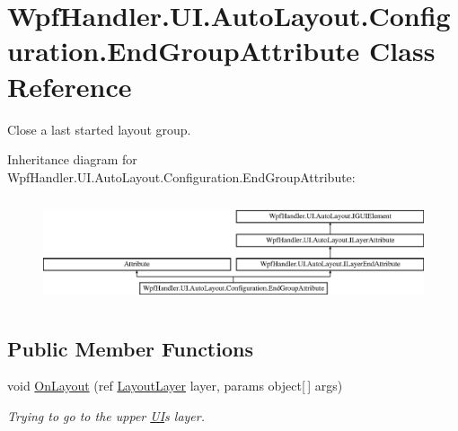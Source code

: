 \hypertarget{class_wpf_handler_1_1_u_i_1_1_auto_layout_1_1_configuration_1_1_end_group_attribute}{}\section{Wpf\+Handler.\+U\+I.\+Auto\+Layout.\+Configuration.\+End\+Group\+Attribute Class Reference}
\label{class_wpf_handler_1_1_u_i_1_1_auto_layout_1_1_configuration_1_1_end_group_attribute}


Close a last started layout group.  


Inheritance diagram for Wpf\+Handler.\+U\+I.\+Auto\+Layout.\+Configuration.\+End\+Group\+Attribute\+:\begin{figure}[H]
\begin{center}
\leavevmode
\includegraphics[height=3.128492cm]{db/de0/class_wpf_handler_1_1_u_i_1_1_auto_layout_1_1_configuration_1_1_end_group_attribute}
\end{center}
\end{figure}
\subsection*{Public Member Functions}
\begin{DoxyCompactItemize}
\item 
void \mbox{\hyperlink{class_wpf_handler_1_1_u_i_1_1_auto_layout_1_1_configuration_1_1_end_group_attribute_acaed685d0daf2b14d8f232389d56c478}{On\+Layout}} (ref \mbox{\hyperlink{class_wpf_handler_1_1_u_i_1_1_auto_layout_1_1_layout_layer}{Layout\+Layer}} layer, params object\mbox{[}$\,$\mbox{]} args)
\begin{DoxyCompactList}\small\item\em Trying to go to the upper \mbox{\hyperlink{namespace_wpf_handler_1_1_u_i}{UI}}\textquotesingle{}s layer. \end{DoxyCompactList}\end{DoxyCompactItemize}
